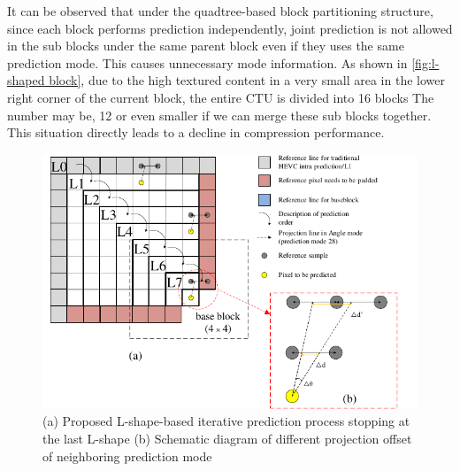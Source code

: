 \documentclass[journal]{IEEEtran}
\begin{document}
It can be observed that under the quadtree-based block partitioning structure, since each block performs prediction independently, joint prediction is not allowed in the sub blocks under the same parent block even if they uses the same prediction mode. This causes unnecessary mode information. As shown in \autoref{fig:l-shaped block}, due to the high textured content in a very small area in the lower right corner of the current block, the entire CTU is divided into 16 blocks The number may be, 12 or even smaller if we can merge these sub blocks together. This situation directly leads to a decline in compression performance.

\begin{figure}[htpb]
    \centering
    \includegraphics[width=14cm]{pictures/Lprediction.pdf}
    \caption{(a) Proposed L-shape-based iterative prediction process stopping at the last L-shape (b) Schematic diagram of different projection offset of neighboring prediction mode}
    \label{fig:comparison}
\end{figure}
\end{document}
